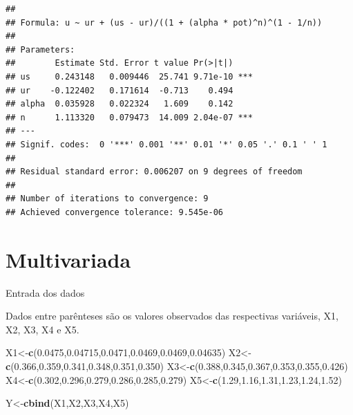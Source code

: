 \documentclass[
]{book}
\newenvironment{Shaded}{\begin{snugshade}}{\end{snugshade}}
\newcommand{\FloatTok}[1]{\textcolor[rgb]{0.00,0.00,0.81}{#1}}
\newcommand{\KeywordTok}[1]{\textcolor[rgb]{0.13,0.29,0.53}{\textbf{#1}}}
\newcommand{\NormalTok}[1]{#1}
\begin{document}
\begin{verbatim}
## 
## Formula: u ~ ur + (us - ur)/((1 + (alpha * pot)^n)^(1 - 1/n))
## 
## Parameters:
##        Estimate Std. Error t value Pr(>|t|)    
## us     0.243148   0.009446  25.741 9.71e-10 ***
## ur    -0.122402   0.171614  -0.713    0.494    
## alpha  0.035928   0.022324   1.609    0.142    
## n      1.113320   0.079473  14.009 2.04e-07 ***
## ---
## Signif. codes:  0 '***' 0.001 '**' 0.01 '*' 0.05 '.' 0.1 ' ' 1
## 
## Residual standard error: 0.006207 on 9 degrees of freedom
## 
## Number of iterations to convergence: 9 
## Achieved convergence tolerance: 9.545e-06
\end{verbatim}

\hypertarget{multivariada}{%
\chapter{Multivariada}\label{multivariada}}

Entrada dos dados

Dados entre parênteses são os valores observados das respectivas variáveis, X1, X2, X3, X4 e X5.

\begin{Shaded}
\begin{Highlighting}[]
\NormalTok{X1<-}\KeywordTok{c}\NormalTok{(}\FloatTok{0.0475}\NormalTok{,}\FloatTok{0.04715}\NormalTok{,}\FloatTok{0.0471}\NormalTok{,}\FloatTok{0.0469}\NormalTok{,}\FloatTok{0.0469}\NormalTok{,}\FloatTok{0.04635}\NormalTok{)}
\NormalTok{X2<-}\KeywordTok{c}\NormalTok{(}\FloatTok{0.366}\NormalTok{,}\FloatTok{0.359}\NormalTok{,}\FloatTok{0.341}\NormalTok{,}\FloatTok{0.348}\NormalTok{,}\FloatTok{0.351}\NormalTok{,}\FloatTok{0.350}\NormalTok{)}
\NormalTok{X3<-}\KeywordTok{c}\NormalTok{(}\FloatTok{0.388}\NormalTok{,}\FloatTok{0.345}\NormalTok{,}\FloatTok{0.367}\NormalTok{,}\FloatTok{0.353}\NormalTok{,}\FloatTok{0.355}\NormalTok{,}\FloatTok{0.426}\NormalTok{)}
\NormalTok{X4<-}\KeywordTok{c}\NormalTok{(}\FloatTok{0.302}\NormalTok{,}\FloatTok{0.296}\NormalTok{,}\FloatTok{0.279}\NormalTok{,}\FloatTok{0.286}\NormalTok{,}\FloatTok{0.285}\NormalTok{,}\FloatTok{0.279}\NormalTok{)}
\NormalTok{X5<-}\KeywordTok{c}\NormalTok{(}\FloatTok{1.29}\NormalTok{,}\FloatTok{1.16}\NormalTok{,}\FloatTok{1.31}\NormalTok{,}\FloatTok{1.23}\NormalTok{,}\FloatTok{1.24}\NormalTok{,}\FloatTok{1.52}\NormalTok{)}
\end{Highlighting}
\end{Shaded}

\begin{Shaded}
\begin{Highlighting}[]
\NormalTok{Y<-}\KeywordTok{cbind}\NormalTok{(X1,X2,X3,X4,X5)}
\end{Highlighting}
\end{Shaded}
\end{document}
